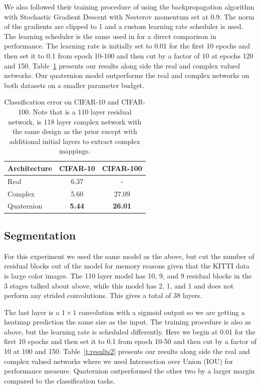 \documentclass[conference]{IEEEtran}
\begin{document}
We also followed their training procedure of using the backpropagation algorithm with Stochastic Gradient Descent with Nesterov momentum \cite{nesterov1983method} set at 0.9.
The norm of the gradients are clipped to 1 and a custom learning rate scheduler is used.
The learning scheduler is the same used in \cite{trabelsi2017deep} for a direct comparison in performance.
The learning rate is initially set to 0.01 for the first 10 epochs and then set it to 0.1 from epoch 10-100 and then cut by a factor of 10 at epochs 120 and 150.
Table~\ref{t:results1} presents our results along side the real and complex valued networks.
Our quaternion model outperforms the real and complex networks on both datasets on a smaller parameter budget.

\begin{table}[h]
	\centering
		\begin{tabular}{l c c}
			\hline
			Architecture & CIFAR-10 & CIFAR-100 \\
			\hline
			\cite{he2016deep} Real & 6.37 & - \\
			\cite{trabelsi2017deep} Complex & 5.60 & 27.09 \\
			Quaternion & \textbf{5.44} & \textbf{26.01}
		\end{tabular}
	\caption{Classification error on CIFAR-10 and CIFAR-100. Note that \cite{he2016deep} is a 110 layer residual network, \cite{trabelsi2017deep} is 118 layer complex network with the same design as the prior except with additional initial layers to extract complex mappings.}
	\label{t:results1}
\end{table}

\subsection{Segmentation}
For this experiment we used the same model as the above, but cut the number of residual blocks out of the model for memory reasons given that the KITTI data is large color images.
The 110 layer model has 10, 9, and 9 residual blocks in the 3 stages talked about above, while this model has 2, 1, and 1 and does not perform any strided convolutions.
This gives a total of 38 layers.

The last layer is a $1 \times 1$ convolution with a sigmoid output so we are getting a heatmap prediction the same size as the input.
The training procedure is also as above, but the learning rate is scheduled differently.
Here we begin at 0.01 for the first 10 epochs and then set it to 0.1 from epoch 10-50 and then cut by a factor of 10 at 100 and 150.
Table~\ref{t:results2} presents our results along side the real and complex valued networks where we used Intersection over Union (IOU) for performance measure.
Quaternion outperformed the other two by a larger margin compared to the classification tasks.
\end{document}

